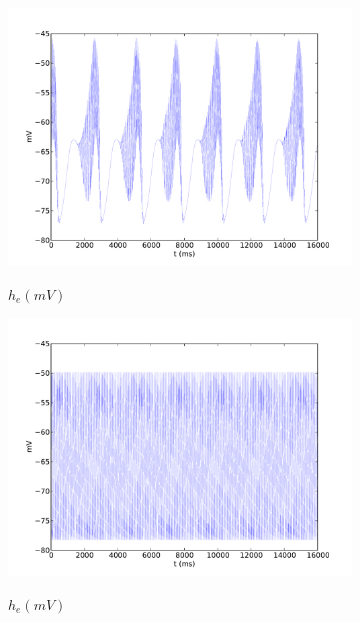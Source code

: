 \documentclass[a4paper,12pt]{article}
\begin{document}
\begin{figure}
	\begin{subfigure}[b]{0.3\textwidth}
		\includegraphics[scale=0.22]{chosen-frontiers-2012/00416-he-phi.pdf}
		\label{fig:416_phi_a}
		\caption{$h_e (mV)$}
	\end{subfigure}
	\begin{subfigure}[b]{0.3\textwidth}
		\includegraphics[scale=0.22]{chosen-frontiers-2012/00416-0_5-2-1-he-phi.pdf}
		\label{fig:416_phi_b}
		\caption{$h_e (mV)$}
	\end{subfigure}
	\begin{subfigure}[b]{0.3\textwidth}

\end{subfigure}
\end{figure}
\end{document}
